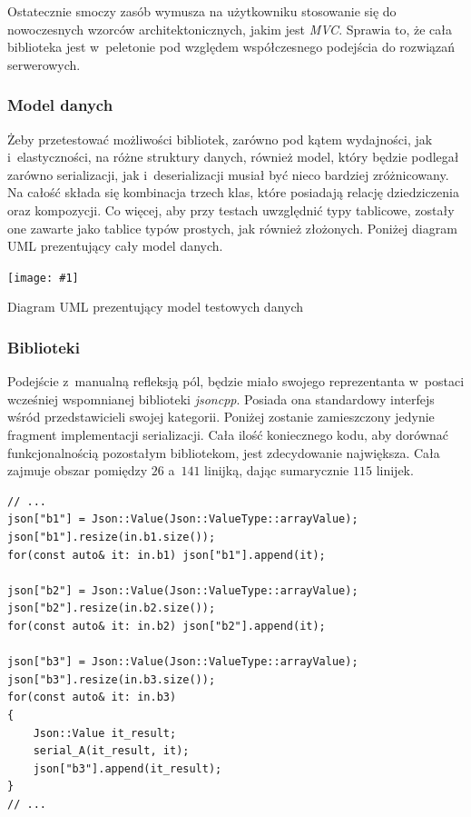 \documentclass[12pt]{article}
\newcommand{\n}{\newline}
\newcommand{\putfig}[3]{
\begin{captioned}[H]
	\centering
	\texttt{[image: \#1]}
	\caption{#2}
	\label{#3}
	\medskip
\end{captioned}
}
\newcommand{\nonpl}[1]{{\it #1}}
\begin{document}
{{{				Ostatecznie smoczy zasób wymusza na użytkowniku stosowanie się do nowoczesnych wzorców architektonicznych, jakim jest \nonpl{MVC}\cite{mvc}.
				Sprawia to, że cała biblioteka jest w~peletonie pod względem współczesnego podejścia do rozwiązań serwerowych.
			}

			{
				\subsubsection{Model danych}

				Żeby przetestować możliwości bibliotek, zarówno pod kątem wydajności, jak i~elastyczności, na różne struktury danych,
				również model, który będzie podlegał zarówno serializacji, jak i~deserializacji musiał być nieco bardziej zróżnicowany.
				Na całość składa się kombinacja trzech klas, które posiadają relację dziedziczenia oraz kompozycji. Co więcej, aby przy
				testach uwzględnić typy tablicowe, zostały one zawarte jako tablice typów prostych, jak również złożonych. Poniżej
				diagram UML prezentujący cały model danych.

				\putfig{./img/benchmark_model_uml_diagram.png}{Diagram UML prezentujący model testowych danych}{uml_diagram}
			}

			{
				\subsubsection{Biblioteki}

				Podejście z~manualną refleksją pól, będzie miało swojego reprezentanta w~postaci wcześniej wspomnianej biblioteki \nonpl{jsoncpp}.
				Posiada ona standardowy interfejs wśród przedstawicieli swojej kategorii. Poniżej zostanie zamieszczony jedynie fragment
				implementacji serializacji. Cała ilość koniecznego kodu, aby dorównać funkcjonalnością pozostałym bibliotekom, jest zdecydowanie
				największa. Cała zajmuje obszar pomiędzy $26$ a~$141$ linijką, dając sumarycznie $115$ linijek.\n

				\begin{lstlisting}[frame=single]
// ...
json["b1"] = Json::Value(Json::ValueType::arrayValue);
json["b1"].resize(in.b1.size());
for(const auto& it: in.b1) json["b1"].append(it);

json["b2"] = Json::Value(Json::ValueType::arrayValue);
json["b2"].resize(in.b2.size());
for(const auto& it: in.b2) json["b2"].append(it);

json["b3"] = Json::Value(Json::ValueType::arrayValue);
json["b3"].resize(in.b3.size());
for(const auto& it: in.b3)
{
	Json::Value it_result;
	serial_A(it_result, it);
	json["b3"].append(it_result);
}
// ...
				\end{lstlisting}

}}}
\end{document}
